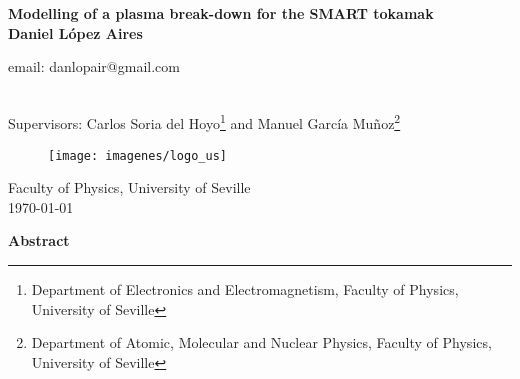 \documentclass[a4paper,12pt,oneside]{book}
\begin{document}
\thispagestyle{empty}




\begin{center}


\textbf{\huge Modelling of a plasma break-down for the SMART tokamak} \\
%
\vspace{3cm}
\textbf{\Large Daniel López Aires} \\
\begin{large}

email: danlopair@gmail.com\end{large} \\
\vspace{.3cm}
Supervisors: Carlos Soria del Hoyo\footnote{Department of Electronics and Electromagnetism, Faculty of Physics, University of Seville} and Manuel García Muñoz\footnote{Department of Atomic, Molecular and Nuclear Physics, Faculty of Physics, University of Seville}\\
%
%
\vfill

\begin{figure}[htbp]
\centering
\texttt{[image: imagenes/logo\_us]}
\end{figure}

\vfill

Faculty of Physics, University of Seville \\
\today \\

%
%
%
\end{center}
%

\newpage\null
\thispagestyle{empty}

%
\newpage


\begin{center}
\begin{large}
\textbf{Abstract}
\end{large}

\end{center}

\end{document}
